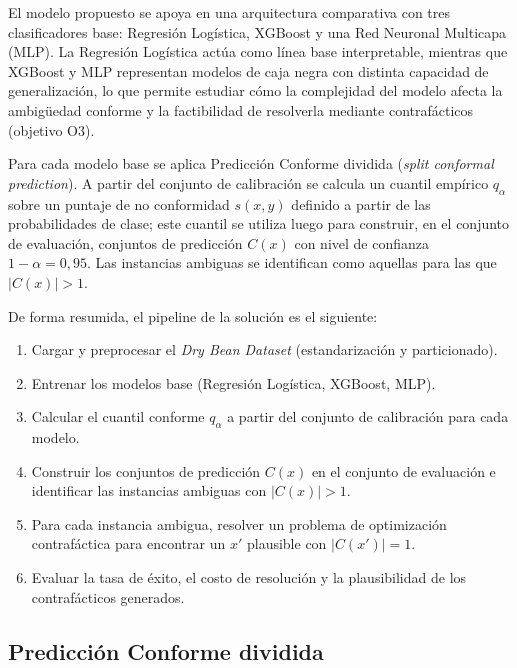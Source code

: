 \documentclass[conference]{IEEEtran}
\begin{document}
El modelo propuesto se apoya en una arquitectura comparativa con tres
clasificadores base: Regresión Logística, XGBoost y una Red Neuronal
Multicapa (MLP). La Regresión Logística actúa como línea base
interpretable, mientras que XGBoost y MLP representan modelos de caja
negra con distinta capacidad de generalización, lo que permite estudiar
cómo la complejidad del modelo afecta la ambigüedad conforme y la
factibilidad de resolverla mediante contrafácticos (objetivo O3).

Para cada modelo base se aplica Predicción Conforme dividida
(\textit{split conformal prediction}). A partir del conjunto de
calibración se calcula un cuantil empírico $q_\alpha$ sobre un puntaje
de no conformidad $s(x,y)$ definido a partir de las probabilidades de
clase; este cuantil se utiliza luego para construir, en el conjunto de
evaluación, conjuntos de predicción $C(x)$ con nivel de confianza
$1-\alpha = 0{,}95$. Las instancias ambiguas se identifican como aquellas
para las que $|C(x)|>1$.

De forma resumida, el pipeline de la solución es el siguiente:
\begin{enumerate}
    \item Cargar y preprocesar el \textit{Dry Bean Dataset}
          (estandarización y particionado).
    \item Entrenar los modelos base (Regresión Logística, XGBoost, MLP).
    \item Calcular el cuantil conforme $q_\alpha$ a partir del conjunto
          de calibración para cada modelo.
    \item Construir los conjuntos de predicción $C(x)$ en el conjunto de
          evaluación e identificar las instancias ambiguas con $|C(x)|>1$.
    \item Para cada instancia ambigua, resolver un problema de
          optimización contrafáctica para encontrar un $x'$ plausible
          con $|C(x')|=1$.
    \item Evaluar la tasa de éxito, el costo de resolución y la
          plausibilidad de los contrafácticos generados.
\end{enumerate}

\subsection{Predicción Conforme dividida}
\end{document}
